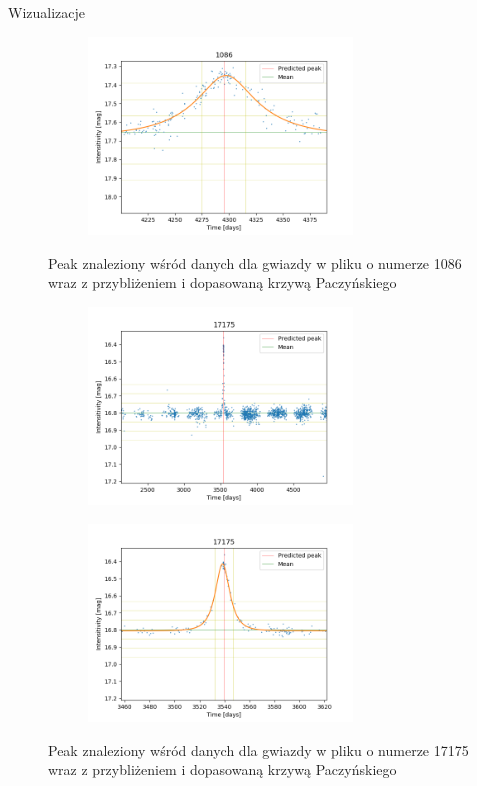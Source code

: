 \documentclass[a4paper,11pt]{article}
\begin{document}
\begin{enumerate}
\begin{enumerate}
\begin{subsection}{Wizualizacje}
\begin{figure}[H]
\begin{subfigure}{0.5\textwidth}
\centering
\includegraphics[width=\linewidth,height=5.25cm]{1086_v.png}
\label{Fig_5}
\end{subfigure}
\caption{Peak znaleziony wśród danych dla gwiazdy w pliku o numerze 1086 wraz z przybliżeniem i dopasowaną krzywą Paczyńskiego}
\end{figure}
\begin{figure}[H]
\begin{subfigure}{0.5\textwidth}
\centering
\includegraphics[width=\linewidth,height=5.25cm]{17175.png}
\label{Fig_6}
\end{subfigure}
\begin{subfigure}{0.5\textwidth}
\centering
\includegraphics[width=\linewidth,height=5.25cm]{17175_v.png}
\label{Fig_7}
\end{subfigure}
\caption{Peak znaleziony wśród danych dla gwiazdy w pliku o numerze 17175 wraz z przybliżeniem i dopasowaną krzywą Paczyńskiego}
\end{figure}

\end{subsection}
\end{enumerate}
\end{enumerate}
\end{document}
